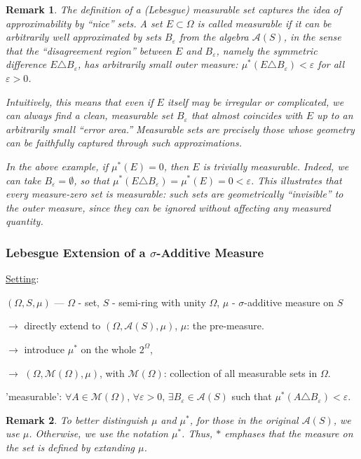 \documentclass[12pt]{article}
\theoremstyle{blueplain}
\theoremstyle{bluedef}
\theoremstyle{blueremark}
\newtheorem{remark}{Remark}[section]
\newcommand{\eps}{\varepsilon}
\numberwithin{equation}{section}
\begin{document}
\begin{remark}
  The definition of a (Lebesgue) measurable set captures the idea of \emph{approximability by “nice” sets}. A set $E \subset \Omega$ is called measurable if it can be arbitrarily well approximated by sets $B_\varepsilon$ from the algebra $\mathcal{A}(S)$, in the sense that the “disagreement region” between $E$ and $B_\varepsilon$, namely the symmetric difference $E \triangle B_\varepsilon$, has arbitrarily small outer measure: $\mu^*(E \triangle B_\varepsilon) < \varepsilon$ for all $\varepsilon > 0$.

  Intuitively, this means that even if $E$ itself may be irregular or complicated, we can always find a clean, measurable set $B_\varepsilon$ that almost coincides with $E$ up to an arbitrarily small “error area.” Measurable sets are precisely those whose geometry can be faithfully captured through such approximations.

  In the above example, if $\mu^*(E)=0$, then $E$ is trivially measurable. Indeed, we can take $B_\varepsilon = \emptyset$, so that $\mu^*(E \triangle B_\varepsilon) = \mu^*(E) = 0 < \varepsilon$. This illustrates that every \emph{measure-zero set} is measurable: such sets are geometrically “invisible” to the outer measure, since they can be ignored without affecting any measured quantity.
\end{remark}

\subsubsection{Lebesgue Extension of a $\sigma$-Additive Measure}

\underline{Setting}:

$(\Omega, S, \mu)$ --- $\Omega$ - set, $S$ - semi-ring with unity $\Omega$, $\mu$ - $\sigma$-additive measure on $S$

$\rightarrow$ directly extend to $(\Omega, \mathcal{A}(S), \mu)$, $\mu$: the pre-measure.

$\rightarrow$ introduce $\mu^*$ on the whole $2^\Omega$,

$\rightarrow$ $(\Omega, \mathcal{M}(\Omega), \mu)$, with $\mathcal{M}(\Omega)$: collection of all measurable sets in $\Omega$.

'measurable': $\forall A \in \mathcal{M}(\Omega)$, $\forall \eps > 0$, $\exists B_{\eps} \in \mathcal{A}(S)$ such that $\mu^*(A \triangle B_{\eps}) < \eps.$

\begin{remark}
  To better distinguish $\mu$ and $\mu^*$, for those in the original $\mathcal{A}(S)$, we use $\mu$. Otherwise, we use the notation $\mu^*$. Thus, $*$ emphases that the measure on the set is defined by extanding $\mu$.
\end{remark}
\end{document}
